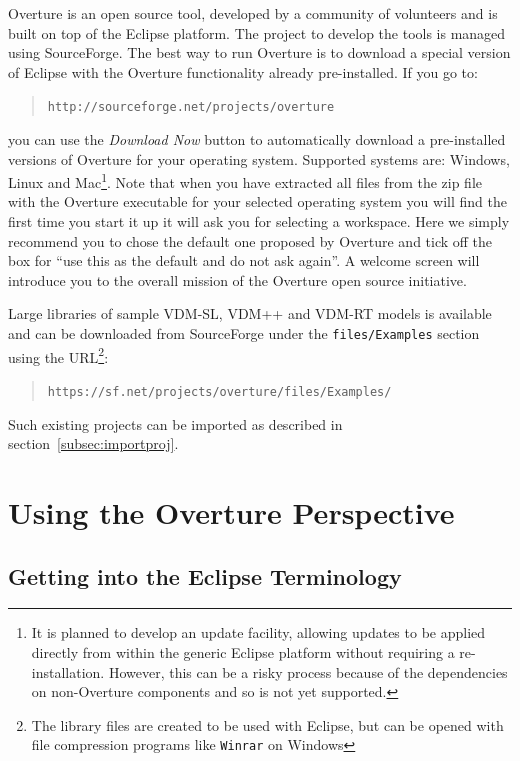 \documentclass{overturerepchap}
\newcommand{\url}[1]{\texttt{#1}}
\begin{document}
Overture is an open source tool, developed by a community of volunteers 
and is built on top of the Eclipse platform. The project to develop the tools 
is managed using SourceForge.  The best way to run Overture is to download 
a special version of Eclipse with the Overture functionality already pre-installed. If you go to:
  \begin{quote}
  \url{http://sourceforge.net/projects/overture}
  \end{quote}
  \noindent you can use the \textit{Download Now} button to
  automatically download a pre-installed versions of Overture for your
  operating system.  Supported systems are: Windows, Linux and
  Mac\footnote{It is planned to develop an update facility, allowing
    updates to be applied directly from within the generic Eclipse
    platform without requiring a re-installation. However, this can be
    a risky process because of the dependencies on non-Overture
    components and so is not yet supported.}.
Note that when you have extracted all files from the zip file with the
Overture executable for your selected operating system you will find
the first time you start it up it will ask you for selecting a
workspace. Here we simply recommend you to chose the default one proposed 
by Overture and tick off the box for ``use this as the default and do
not ask again''. A welcome screen will introduce you to the overall 
mission of the Overture open source initiative. 

Large libraries of sample VDM-SL, VDM++ and VDM-RT models is available
and can be downloaded from SourceForge under the
\texttt{files/Examples} section using the URL\footnote{The library
  files are created to be used with Eclipse, but can be opened with
  file compression programs like \texttt{Winrar} on Windows}:
\begin{quote}
\url{https://sf.net/projects/overture/files/Examples/}
\end{quote}
Such existing projects can be imported as described in
section~\ref{subsec:importproj}. 

\chapter{Using the Overture Perspective}\label{sec:vdmsupport}

\section{Getting into the Eclipse Terminology}
\end{document}
